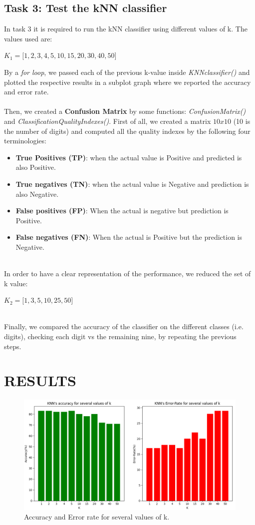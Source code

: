 \documentclass[10pt]{article}
\begin{document}
\subsection{Task 3: Test the kNN classifier}
In task 3 it is required to run the kNN classifier using different values of k. The values used are:
\begin{center}
    $K_1 =\bigr[1,2,3,4,5,10,15,20,30,40,50\bigr]$ 
\end{center}
By a \textit{for loop}, we passed each of the previous k-value inside \textit{KNNclassifier()} and plotted the respective results in a subplot graph where we reported the accuracy and error rate.
\\\\
Then, we created a \textbf{Confusion Matrix} by some functions: \textit{ConfusionMatrix()} and \textit{ClassificationQualityIndexes()}.
First of all, we created a matrix $10x10$ (10 is the number of digits) and computed all the quality indexes by the following four terminologies:
\begin{itemize}
 \item \textbf{True Positives (TP)}: when the actual value is Positive and predicted is also Positive.
 \item \textbf{True negatives (TN)}: when the actual value is Negative and prediction is also Negative.
 \item \textbf{False positives (FP)}: When the actual is negative but prediction is Positive.
 \item \textbf{False negatives (FN)}: When the actual is Positive but the prediction is Negative.
 \end{itemize} 
 \\
 In order to have a clear representation of the performance, we reduced the set of k value:
 \begin{center}
    $K_2 =\bigr[1,3,5,10,25,50\bigr]$ 
\end{center}
\\
Finally, we compared the accuracy of the classifier on the different classes (i.e. digits), checking each digit vs the
remaining nine,  by repeating the previous steps.

\section{RESULTS}

\begin{figure}[h] 
	\centering
	\includegraphics[width=0.9\columnwidth]{Figure_1.png} %
	\caption{Accuracy and Error rate for several values of k.}
\end{figure}
\end{document}
